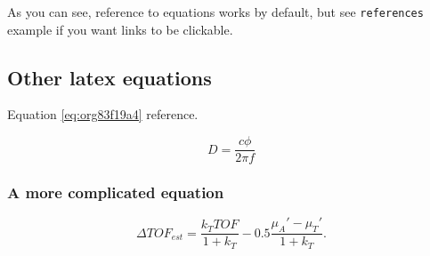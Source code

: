 As you can see, reference to equations works by default, but see \texttt{references}
example if you want links to be clickable.

\subsection{Other latex equations}
\label{sec:orgbc7d0f1}
Equation \ref{eq:org83f19a4} reference.

\begin{equation}
\label{eq:org83f19a4}
D = \frac{c\phi}{2\pi f}
\end{equation}

\subsubsection{A more complicated equation}
\label{sec:org15657c1}

\begin{equation}
\Delta TOF_{est} = \frac{k_T TOF}{1+k_T } - 0.5 \frac{\mu_A' - \mu_T'}{1+k_T}.
\end{equation}


